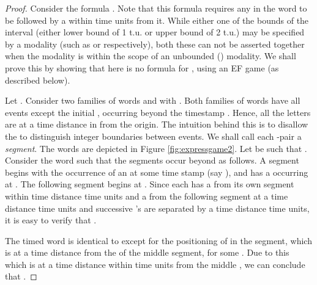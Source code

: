 \documentclass{llncs}
\newcommand{\mitlfp}{\mbox{}}
\newcommand{\ssp}{\mbox{}}
\newcommand{\mitlfpzinf}{\mbox{}}
\begin{document}
\begin{theorem}
\mitlfpzinf  \mitlfp
\end{theorem}
\begin{proof}
Consider the \mitlfp\/ formula . Note that this formula requires any  in the word to be followed by a  within  time units from it. While either one of the bounds of the interval  (either lower bound of 1 t.u. or upper bound of 2 t.u.) may be specified by a \mitlfpzinf\/ modality (such as  or  respectively), both these can not be asserted together when the  modality is within the scope of an unbounded () modality. We shall prove this by showing that here is no \mitlfpzinf\/ formula for , using an \mitlfpzinf\/ EF game (as described below).

Let . Consider two families of words  and  with . Both families of words have all events except the initial , occurring beyond the timestamp . Hence, all the letters are at a time distance in  from the origin. The intuition behind this is to disallow the \ssp\/ to distinguish integer boundaries between events. 
We shall call each -pair a \emph{segment}. The words are depicted in Figure \ref{fig:expressgame2}. Let  be such that . Consider the word  such that the segments occur beyond  as follows. A segment begins with the occurrence of an  at some time stamp (say ), and has a  occurring at . The following segment begins at . Since each  has a  from its own segment within time distance  time units and a  from the following segment at a time distance  time units and successive 's are separated by a time distance  time units, it is easy to verify that .

The timed word  is identical to  except for the positioning of  in the  segment, which is at a time distance  from the  of the middle  segment, for some . Due to this  which is at a time distance within  time units from the middle , we can conclude that .


\end{proof}
\end{document}
